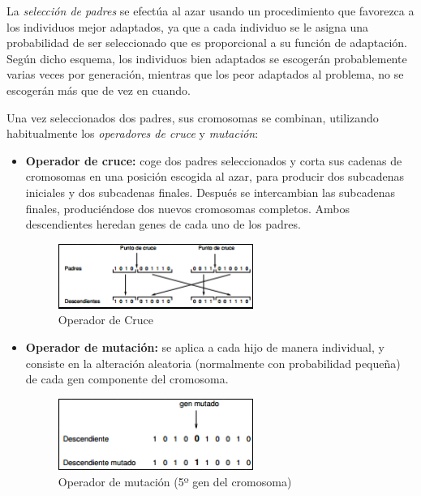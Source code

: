 \documentclass[a4paper, 11pt]{article} %
\begin{document}
La \textit{selección de padres} se efectúa al azar usando un procedimiento que favorezca a los individuos mejor
adaptados, ya que a cada individuo se le asigna una probabilidad de ser seleccionado que es proporcional a su función de adaptación. Según dicho esquema, los individuos bien adaptados se escogerán probablemente varias veces por generación, mientras que los peor adaptados al problema, no se escogerán más que de vez en
cuando.

Una vez seleccionados dos padres, sus cromosomas se combinan, utilizando habitualmente los \textit{operadores
de cruce} y \textit{mutación}:

\begin{itemize}
    \item \textbf{Operador de cruce:} coge dos padres seleccionados y corta sus cadenas de cromosomas en una posición escogida al azar, para producir dos subcadenas iniciales y dos subcadenas finales. Después se intercambian las subcadenas finales, produciéndose dos nuevos cromosomas completos. Ambos descendientes heredan genes de cada uno de los padres.

\begin{figure}[H]
\centering
\includegraphics[width=0.6\textwidth]{OperadorCruce.PNG}
\caption{Operador de Cruce}
\label{Operador de Cruce}
\end{figure}

    \item \textbf{Operador de mutación:} se aplica a cada hijo de manera individual, y consiste en la alteración aleatoria (normalmente con probabilidad pequeña) de cada gen componente del cromosoma.

\begin{figure}[H]
\centering
\includegraphics[width=0.6\textwidth]{OperadorMutacion.PNG}
\caption{Operador de mutación (5º gen del cromosoma)}
\label{Operador de Mutacion}
\end{figure}
\end{itemize}
\end{document}
